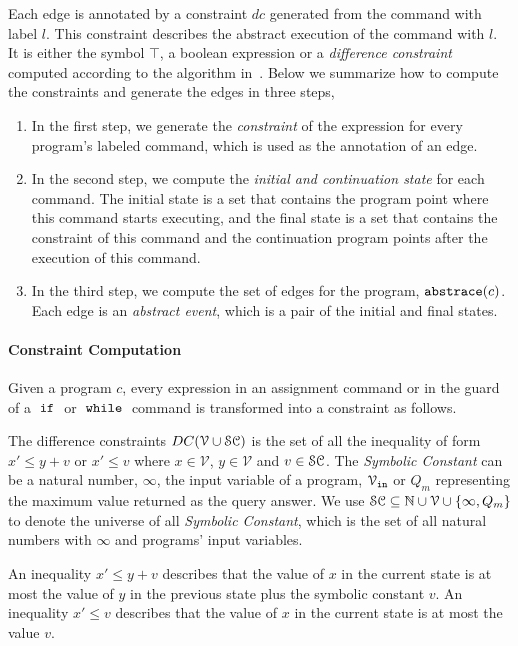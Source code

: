 Each edge is annotated by a constraint $dc$ generated from the command with label $l$.
This constraint describes the abstract execution of the command with $l$. 
It is either
the symbol $\top$, 
a boolean expression or 
a \emph{difference constraint} computed according to the algorithm in~\cite{SinnZV17}.
Below we summarize how to compute the constraints and generate the edges in three steps,
\begin{enumerate}
 \item In the first step, we generate the \emph{constraint}
 of the expression for every program's labeled command,
 which is used as the annotation of an edge.

 \item In the second step, we compute the \emph{initial and continuation state} for each command. 
 The initial state is a set that contains the
 program point where this command {starts} executing, 
 and the final state is a set
 that contains the constraint of this command
 and the continuation program points after the execution of this command.

 \item In the third step, we compute the set of edges for the program, $\mathtt{abs}{\mathtt{trace}}(c)$.
 Each edge is an \emph{abstract event}, which is a pair of the initial and final states.
\end{enumerate}
%
\paragraph{Constraint Computation}
Given a program $c$,
every expression in an assignment command or in the guard of a $\;\mathtt{if}\;$ or $\;\mathtt{while}\;$ command
is transformed into a constraint as follows.
%
%
\begin{defn}
The difference constraints $DC(\mathcal{V} \cup \mathcal{SC})$ is the set of all the inequality of
form $x' \leq y + v$ or $x' \leq v$ where $x \in \mathcal{V} $, 
$y \in \mathcal{V}$ and $v \in \mathcal{SC}$.
The \emph{Symbolic Constant} can be a natural number, $\infty$, the input variable of a program, $\mathcal{V}_{\mathtt{\mathtt{in}}}$ or
$Q_m$ representing the maximum value returned as the query answer. 
We use $\mathcal{SC} \subseteq \mathbb{N} \cup \mathcal{V} \cup \{ \infty, Q_m \}$ to denote the universe of all \emph{Symbolic Constant},
which is the set of all natural numbers with $\infty$ and programs' input variables.
\end{defn}
An inequality $x' \leq y + v$ describes that the value of $x$ in the current state is
at most the value of $y$ in the previous state plus the symbolic constant $v$.
An inequality $x' \leq v$ describes that the value of $x$ in the current state is
at most the value $v$.

